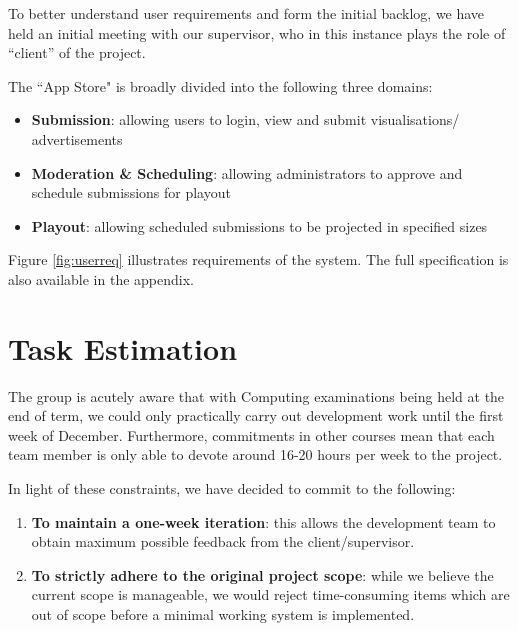 \documentclass[a4paper]{article}
\begin{document}
To better understand user requirements and form the initial backlog, we have
held an initial meeting with our supervisor, who in this instance plays the role of ``client'' of the 
project.

The ``App Store" is broadly divided into the following three domains:
\begin{itemize}
  \item \textbf{Submission}: allowing users to login, view and submit 
        visualisations/ advertisements
  \item \textbf{Moderation \& Scheduling}: allowing administrators to approve
        and schedule submissions for playout
  \item \textbf{Playout}: allowing scheduled submissions to be projected in
        specified sizes

\end{itemize}



Figure \ref{fig:userreq} illustrates requirements of the system.
The full specification is also available in the appendix.

\section{Task Estimation}
The group is acutely aware that with Computing examinations being held at the
end of term, we could only practically carry out development work until the
first week of December. Furthermore, commitments in other courses mean that 
each team member is only able to devote around 16-20 hours per week to
the project.

In light of these constraints, we have decided to commit to the following:
\begin{enumerate}
  \item \textbf{To maintain a one-week iteration}: this allows the development team to
        obtain maximum possible feedback from the client/supervisor.
  \item \textbf{To strictly adhere to the original project scope}: while we believe the
        current scope is manageable, we would reject time-consuming items which
        are out of scope before a minimal working system is implemented.
\end{enumerate}
\end{document}
